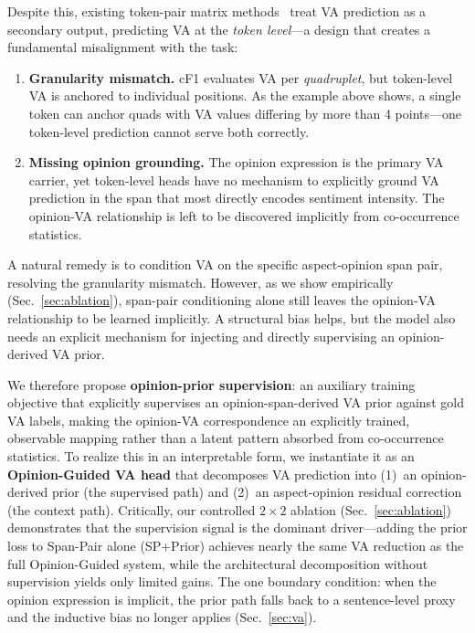\documentclass[runningheads]{llncs}
\begin{document}
Despite this, existing token-pair matrix methods~\cite{gao2023oneasqp} treat VA prediction as a secondary output, predicting VA at the \emph{token level}---a design that creates a fundamental misalignment with the task:

\begin{enumerate}
    \item \textbf{Granularity mismatch.} cF1 evaluates VA per \emph{quadruplet}, but token-level VA is anchored to individual positions. As the example above shows, a single token can anchor quads with VA values differing by more than 4 points---one token-level prediction cannot serve both correctly.
    \item \textbf{Missing opinion grounding.} The opinion expression is the primary VA carrier, yet token-level heads have no mechanism to explicitly ground VA prediction in the span that most directly encodes sentiment intensity. The opinion-VA relationship is left to be discovered implicitly from co-occurrence statistics.
\end{enumerate}

A natural remedy is to condition VA on the specific aspect-opinion span pair, resolving the granularity mismatch. However, as we show empirically (Sec.~\ref{sec:ablation}), span-pair conditioning alone still leaves the opinion-VA relationship to be learned implicitly. A structural bias helps, but the model also needs an explicit mechanism for injecting and directly supervising an opinion-derived VA prior.

We therefore propose \textbf{opinion-prior supervision}: an auxiliary training objective that explicitly supervises an opinion-span-derived VA prior against gold VA labels, making the opinion-VA correspondence an explicitly trained, observable mapping rather than a latent pattern absorbed from co-occurrence statistics. To realize this in an interpretable form, we instantiate it as an \textbf{Opinion-Guided VA head} that decomposes VA prediction into (1)~an opinion-derived prior (the supervised path) and (2)~an aspect-opinion residual correction (the context path). Critically, our controlled $2\!\times\!2$ ablation (Sec.~\ref{sec:ablation}) demonstrates that the supervision signal is the dominant driver---adding the prior loss to Span-Pair alone (SP+Prior) achieves nearly the same VA reduction as the full Opinion-Guided system, while the architectural decomposition without supervision yields only limited gains. The one boundary condition: when the opinion expression is implicit, the prior path falls back to a sentence-level proxy and the inductive bias no longer applies (Sec.~\ref{sec:va}).
\end{document}
